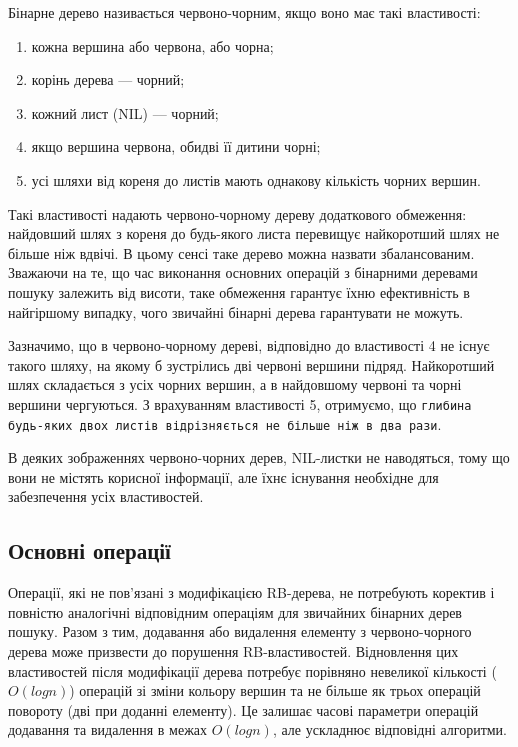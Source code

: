 \documentclass[a4paper,10pt,notitlepage,pdftex,headsepline]{scrartcl}
\begin{document}
Бінарне дерево називається червоно-чорним, якщо воно має такі властивості:
\begin{enumerate}
\item кожна вершина або червона, або чорна;
\item корінь дерева --- чорний;
\item кожний лист (NIL) --- чорний;
\item якщо вершина червона, обидві її дитини чорні;
\item усі шляхи від кореня до листів мають однакову кількість чорних вершин.
\end{enumerate}
Такі властивості надають червоно-чорному дереву додаткового обмеження:
найдовший шлях з кореня до будь-якого листа перевищує найкоротший шлях не більше ніж вдвічі.
В цьому сенсі таке дерево можна назвати збалансованим.
Зважаючи на те, що час виконання основних операцій з бінарними деревами пошуку залежить від висоти, таке обмеження гарантує їхню ефективність в найгіршому випадку, чого звичайні бінарні дерева гарантувати не можуть.

Зазначимо, що в червоно-чорному дереві, відповідно до властивості 4 не існує такого шляху, на якому б зустрілись дві червоні вершини підряд.
Найкоротший шлях складається з усіх чорних вершин, а в найдовшому червоні та чорні вершини чергуються.
З врахуванням властивості 5, отримуємо, що \texttt{глибина будь-яких двох листів відрізняється не більше ніж в два рази}.

В деяких зображеннях червоно-чорних дерев, NIL-листки не наводяться, тому що вони не містять корисної інформації, але їхнє існування необхідне для забезпечення усіх властивостей.

\subsection{Основні операції}
Операції, які не пов'язані з модифікацією RB-дерева, не потребують коректив і повністю аналогічні відповідним операціям для звичайних бінарних дерев пошуку.
Разом з тим, додавання або видалення елементу з червоно-чорного дерева може призвести до порушення RB-властивостей.
Відновлення цих властивостей після модифікації дерева потребує порівняно невеликої кількості ($O(log n)$) операцій зі зміни кольору вершин та не більше як трьох операцій повороту (дві при доданні елементу).
Це залишає часові параметри операцій додавання та видалення в межах $O(log n)$, але ускладнює відповідні алгоритми.
\end{document}
